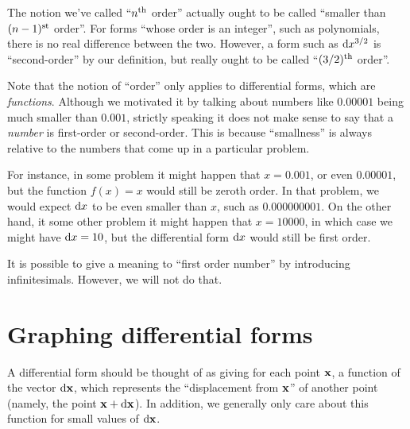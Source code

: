 \documentclass[12pt]{amsart}
\begin{document}
\begin{adv}
  The notion we've called ``$n^{\mathrm{th}}$ order'' actually ought to be called ``smaller than $(n-1)^{\mathrm{st}}$ order''.
  For forms ``whose order is an integer'', such as polynomials, there is no real difference between the two.
  However, a form such as $\mathrm{d} x^{3/2}$ is ``second-order'' by our definition, but really ought to be called ``$(3/2)^{\mathrm{th}}$ order''.
\end{adv}

\begin{rmk}
  Note that the notion of ``order'' only applies to differential forms, which are \emph{functions}.
  Although we motivated it by talking about numbers like $0.00001$ being much smaller than $0.001$, strictly speaking it does not make sense to say that a \emph{number} is first-order or second-order.
  This is because ``smallness'' is always relative to the numbers that come up in a particular problem.

  For instance, in some problem it might happen that $x=0.001$, or even $0.00001$, but the function $f(x) = x$ would still be zeroth order.
  In that problem, we would expect $\mathrm{d} x$ to be even smaller than $x$, such as $0.000000001$.
  On the other hand, it some other problem it might happen that $x = 10000$, in which case we might have $\mathrm{d} x = 10$, but the differential form $\mathrm{d} x$ would still be first order.

  It is possible to give a meaning to ``first order number'' by introducing infinitesimals.
  However, we will not do that.
\end{rmk}


\section{Graphing differential forms}
\label{sec:graphing-differential-forms}

A differential form should be thought of as giving for each point $\mathbf{x}$, a function of the vector $\mathrm{d} \mathbf{x}$, which represents the ``displacement from $\mathbf{x}$'' of another point (namely, the point $\mathbf{x}+\mathrm{d} \mathbf{x}$).
In addition, we generally only care about this function for small values of $\mathrm{d} \mathbf{x}$.
\end{document}
